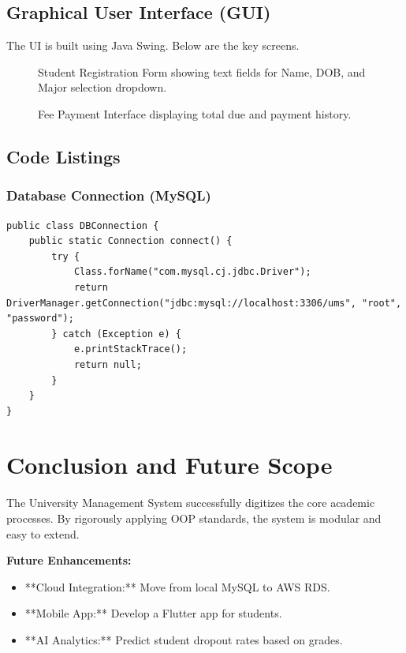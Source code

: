 \documentclass[12pt, a4paper]{report}
\begin{document}
\section{Graphical User Interface (GUI)}
The UI is built using Java Swing. Below are the key screens.

\begin{figure}[H]
    \centering
    \caption{Student Registration Form showing text fields for Name, DOB, and Major selection dropdown.}
    \label{fig:ui_reg}
\end{figure}

\begin{figure}[H]
    \centering
    \caption{Fee Payment Interface displaying total due and payment history.}
    \label{fig:ui_fee}
\end{figure}

\section{Code Listings}

\subsection{Database Connection (MySQL)}
\begin{lstlisting}[caption={DBConnection.java}]
public class DBConnection {
    public static Connection connect() {
        try {
            Class.forName("com.mysql.cj.jdbc.Driver");
            return DriverManager.getConnection("jdbc:mysql://localhost:3306/ums", "root", "password");
        } catch (Exception e) {
            e.printStackTrace();
            return null;
        }
    }
}
\end{lstlisting}

\chapter{Conclusion and Future Scope}
The University Management System successfully digitizes the core academic processes. By rigorously applying OOP standards, the system is modular and easy to extend.

\textbf{Future Enhancements:}
\begin{itemize}
    \item **Cloud Integration:** Move from local MySQL to AWS RDS.
    \item **Mobile App:** Develop a Flutter app for students.
    \item **AI Analytics:** Predict student dropout rates based on grades.
\end{itemize}
\end{document}
